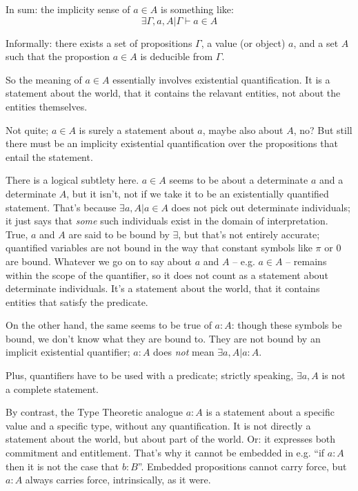 In sum:  the implicity sense of \(a\in A\) is something like: 
\[\exists \Gamma, a, A | \Gamma\vdash a\in A\]

Informally: there exists a set of propositions \(\Gamma\), a value (or
object) \(a\), and a set \(A\) such that the propostion \(a\in A\) is
deducible from \(\Gamma\).

So the meaning of \(a\in A\) essentially involves existential
quantification.  It is a statement about the world, that it contains
the relavant entities, not about the entities themselves.

\begin{remark}
  Not quite; \(a\in A\) is surely a statement about \(a\), maybe also
  about \(A\), no?  But still there must be an implicity existential
  quantification over the propositions that entail the statement.
\end{remark}

There is a logical subtlety here.  \(a\in A\) seems to be about a
determinate \(a\) and a determinate \(A\), but it isn't, not if we
take it to be an existentially quantified statement.  That's because
\(\exists a, A | a\in A\) does not pick out determinate individuals;
it just says that \textit{some} such individuals exist in the domain
of interpretation.  True, \(a\) and \(A\) are said to be bound by
\(\exists\), but that's not entirely accurate; quantified variables
are not bound in the way that constant symbols like \(\pi\) or \(0\)
are bound.  Whatever we go on to say about \(a\) and \(A\) --
e.g. \(a\in A\) -- remains within the scope of the quantifier, so it
does not count as a statement about determinate individuals.  It's a
statement about the world, that it contains entities that satisfy the
predicate.

On the other hand, the same seems to be true of \(a : A\): though
these symbols be bound, we don't know what they are bound to.  They
are not bound by an implicit existential quantifier; \(a : A\) does
\textit{not} mean \(\exists a, A | a : A\).

\begin{remark}
  Plus, quantifiers have to be used with a predicate; strictly
  speaking, \(\exists a, A\) is not a complete statement.
\end{remark}

By contrast, the Type Theoretic analogue \(a : A\) is a statement
about a specific value and a specific type, without any
quantification.  It is not directly a statement about the world, but
about part of the world.  Or: it expresses both commitment and
entitlement.  That's why it cannot be embedded in e.g. ``if \(a : A\)
then it is not the case that \(b : B\)''.  Embedded propositions
cannot carry force, but \(a : A\) always carries force, intrinsically,
as it were.

